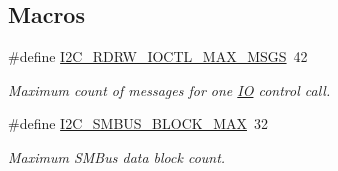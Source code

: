 \subsection*{Macros}
\begin{DoxyCompactItemize}
\item 
\mbox{\label{group__I2CLinux_ga272399a0175400a2ebb55ff518a85012}} 
\#define \mbox{\hyperlink{group__I2CLinux_ga272399a0175400a2ebb55ff518a85012}{I2\+C\+\_\+\+R\+D\+R\+W\+\_\+\+I\+O\+C\+T\+L\+\_\+\+M\+A\+X\+\_\+\+M\+S\+GS}}~42
\begin{DoxyCompactList}\small\item\em Maximum count of messages for one \mbox{\hyperlink{structIO}{IO}} control call. \end{DoxyCompactList}\item 
\mbox{\label{group__I2CLinux_gac2dd8b77e329bba4a3ca9cd275f9bf50}} 
\#define \mbox{\hyperlink{group__I2CLinux_gac2dd8b77e329bba4a3ca9cd275f9bf50}{I2\+C\+\_\+\+S\+M\+B\+U\+S\+\_\+\+B\+L\+O\+C\+K\+\_\+\+M\+AX}}~32
\begin{DoxyCompactList}\small\item\em Maximum S\+M\+Bus data block count. \end{DoxyCompactList}\end{DoxyCompactItemize}
